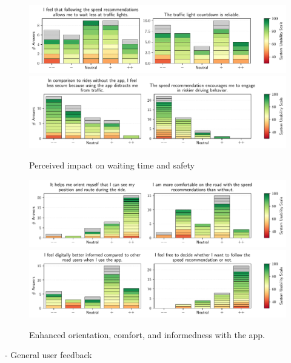 \begin{figure}[t]
\caption{Perceived impact on waiting time and safety}\label{fig:waiting-time-at-traffic-lights}
\includegraphics[width=\linewidth]{images/app-usability-questions-waiting-time-at-traffic-lights.pdf} 
\\
\includegraphics[width=\linewidth]{images/app-usability-questions-app-impact-on-safety.pdf}
\end{figure}
          

\begin{figure}[t]
\caption{Enhanced orientation, comfort, and informedness with the app.}\label{fig:app-enhanced-orientation}
\includegraphics[width=\linewidth]{images/app-usability-questions-app-enhanced-orientation.pdf}
\\
\includegraphics[width=\linewidth]{images/app-usability-questions-app-informedness-freedom.pdf}
\end{figure}

- General user feedback

